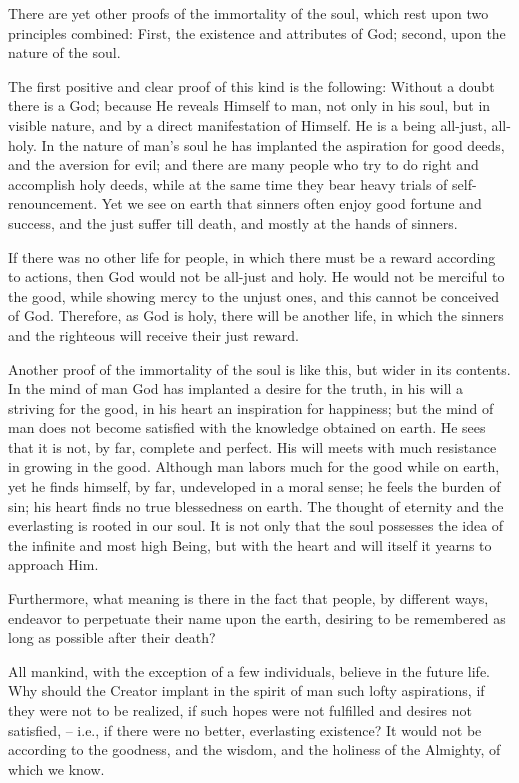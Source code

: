 There are yet other proofs of the immortality of the soul, which rest upon two principles combined: First, the existence and attributes of God; second, upon the nature of the soul.

The first positive and clear proof of this kind is the following: Without a doubt there is a God; because He reveals Himself to man, not only in his soul, but in visible nature, and by a direct manifestation of Himself. He is a being all-just, all-holy. In the nature of man's soul he has implanted the aspiration for good deeds, and the aversion for evil; and there are many people who try to do right and accomplish holy deeds, while at the same time they bear heavy trials of self-renouncement. Yet we see on earth that sinners often enjoy good fortune and success, and the just suffer till death, and mostly at the hands of sinners.

If there was no other life for people, in which there must be a reward according to actions, then God would not be all-just and holy. He would not be merciful to the good, while showing mercy to the unjust ones, and this cannot be conceived of God. Therefore, as God is holy, there will be another life, in which the sinners and the righteous will receive their just reward.

Another proof of the immortality of the soul is like this, but wider in its contents. In the mind of man God has implanted a desire for the truth, in his will a striving for the good, in his heart an inspiration for happiness; but the mind of man does not become satisfied with the knowledge obtained on earth. He sees that it is not, by far, complete and perfect. His will meets with much resistance in growing in the good. Although man labors much for the good while on earth, yet he finds himself, by far, undeveloped in a moral sense; he feels the burden of sin; his heart finds no true blessedness on earth. The thought of eternity and the everlasting is rooted in our soul. It is not only that the soul possesses the idea of the infinite and most high Being, but with the heart and will itself it yearns to approach Him.

Furthermore, what meaning is there in the fact that people, by different ways, endeavor to perpetuate their name upon the earth, desiring to be remembered as long as possible after their death?

All mankind, with the exception of a few individuals, believe in the future life. Why should the Creator implant in the spirit of man such lofty aspirations, if they were not to be realized, if such hopes were not fulfilled and desires not satisfied, -- i.e., if there were no better, everlasting existence? It would not be according to the goodness, and the wisdom, and the holiness of the Almighty, of which we know.

